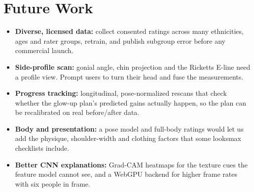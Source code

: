 \documentclass[sigconf,nonacm]{acmart}
\begin{document}
\section{Future Work}
\begin{itemize}[leftmargin=*,nosep]
  \item \textbf{Diverse, licensed data:} collect consented ratings across many ethnicities, ages and rater groups, retrain,
        and publish subgroup error before any commercial launch.
  \item \textbf{Side-profile scan:} gonial angle, chin projection and the Ricketts E-line need a profile view. Prompt users to turn
        their head and fuse the measurements.
  \item \textbf{Progress tracking:} longitudinal, pose-normalized rescans that check whether the glow-up plan's
        predicted gains actually happen, so the plan can be recalibrated on real before/after data.
  \item \textbf{Body and presentation:} a pose model and full-body ratings would let us add the physique,
        shoulder-width and clothing factors that some looksmax checklists include.
  \item \textbf{Better CNN explanations:} Grad-CAM heatmaps for the texture cues the feature model cannot see, and a WebGPU
        backend for higher frame rates with six people in frame.
\end{itemize}



\end{document}
